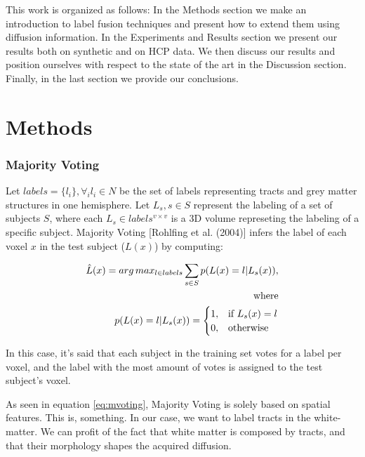 This work is organized as follows: In the Methods section we make an introduction
to label fusion techniques and present how to extend them using diffusion
information. In the Experiments and Results section we present our results 
both on synthetic and on HCP data. We then discuss our results and position
ourselves with respect to the state of the art in the Discussion section. 
Finally, in the last section we provide our conclusions.

\section{Methods}

\subsubsection{Majority Voting}
Let $labels = \{l_i\}, \forall_i l_i \in N$ be the set of labels representing
tracts and grey matter structures in one hemisphere. Let ${L_s}, s \in S$
represent the labeling of a set of subjects $S$, where each 
$L_s \in labels^{v\times v}$ is a 3D volume represeting the labeling of a
specific subject. Majority Voting [Rohlfing et al. (2004)] infers the label of
each voxel $x$ in the test subject ($L(x)$) by computing:

\begin{equation}
\label{eq:mvoting}
\begin{aligned}
    \hat L(x) = arg\,max_{l \in labels} \sum_{s\in S} p(L(x) = l | L_s(x)),\\
    \text{where} \\
    p(L(x) = l | L_s(x)) =
    \begin{cases}
        1,& \text{if } L_s(x) = l \\
        0,& \text{otherwise}
    \end{cases}
\end{aligned}
\end{equation}

In this case, it's said that each subject in the training set votes for a label
per voxel, and the label with the most amount of votes is assigned to the test
subject's voxel.

As seen in equation \ref{eq:mvoting}, Majority Voting is solely based on
spatial features. This is, something. In our case, we want to label tracts
in the white-matter. We can profit of the fact that white matter is composed
by tracts, and that their morphology shapes the acquired diffusion.

